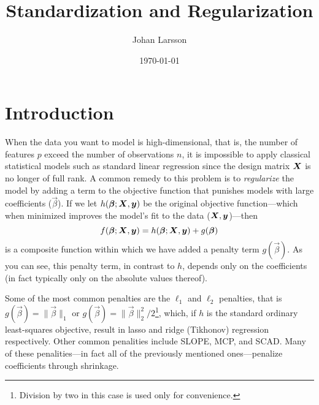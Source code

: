 


\title{Standardization and Regularization}
\author[1,*]{Johan Larsson}
\date{\today}

% 



\maketitle

\section{Introduction}

When the data you want to model is high-dimensional, that is, the number of features \(p\) exceed the number of observations \(n\), it is impossible to apply classical statistical models such as standard linear regression since the design matrix \(\mat X\) is no longer of full rank. A common remedy to this problem is to \emph{regularize} the model by adding a term to the objective function that punishes models with large coefficients (\(\vec\beta\)). If we let \(h(\vec\beta; \mat X, \vec y)\) be the original objective function---which when minimized improves the model's fit to the data (\(\mat X, \vec y\))---then
\[
  f(\vec\beta; \mat X, \vec y) = h(\vec\beta; \mat X, \vec y) + g(\vec\beta)
\]
is a composite function within which we have added a penalty term \(g(\vec\beta)\). As you can see, this penalty term, in contrast to \(h\), depends only on the coefficients (in fact typically only on the absolute values thereof).

Some of the most common penalties are the \(\ell_1\) and \(\ell_2\) penalties, that is \(g(\vec\beta) = \lVert \vec\beta \rVert_1\) or \(g(\vec\beta) = \lVert \vec\beta \rVert_2^2/2\)\footnote{Division by two in this case is used only for convenience.}, which, if \(h\) is the standard ordinary least-squares objective, result in lasso and ridge (Tikhonov) regression respectively. Other common penalities include SLOPE, MCP, and SCAD. Many of these penalities---in fact all of the previously mentioned ones---penalize coefficients through shrinkage.

